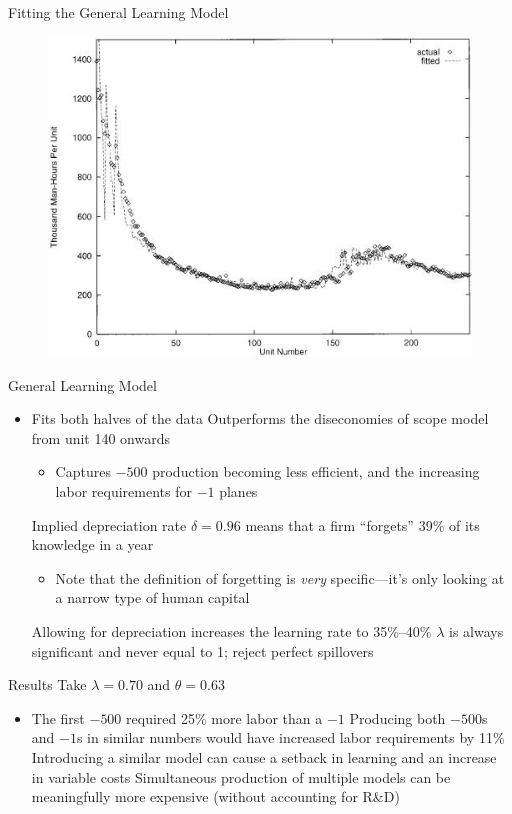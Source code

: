 \documentclass[dvipsnames]{beamer}
\begin{document}
%
\begin{frame}{Fitting the General Learning Model}
  \begin{figure}[htp]
    \centering
    \includegraphics[width=\textwidth, keepaspectratio=true]{fig4.jpg}
  \end{figure}
\end{frame}
%
\begin{frame}{General Learning Model}
  \begin{itemize}
  \item Fits both halves of the data
    \vitem Outperforms the diseconomies of scope model from unit 140 onwards
    \begin{itemize}
    \item Captures $-500$ production becoming less efficient, and the increasing labor requirements for $-1$ planes
    \end{itemize}
    \vitem Implied depreciation rate $\delta = 0.96$ means that a firm ``forgets'' 39\% of its knowledge in a year
    \begin{itemize}
    \item Note that the definition of forgetting is \emph{very} specific---it's only looking at a narrow type of human capital
    \end{itemize}
    \vitem Allowing for depreciation increases the learning rate to 35\%--40\%
    \vitem $\lambda$ is always significant and never equal to 1; reject perfect spillovers
  \end{itemize}
\end{frame}
%
\begin{frame}{Results}
 Take $\lambda = 0.70$ and $\theta = 0.63$ 
 \begin{itemize}
 \item The first $-500$ required 25\% more labor than a $-1$
   \vitem Producing both $-500$s and $-1$s in similar numbers would have increased labor requirements by 11\%
   \vitem Introducing a similar model can cause a setback in learning and an increase in variable costs
   \vitem Simultaneous production of multiple models can be meaningfully more expensive (without accounting for R\&D)
 \end{itemize}
\end{frame}
\end{document}
